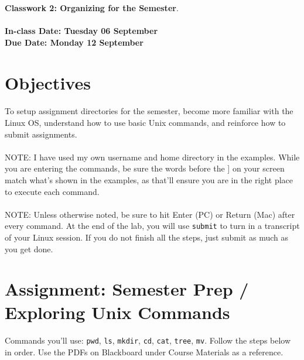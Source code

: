 \documentclass[letter,11pt]{article}
\begin{document}
\huge
\textbf{Classwork 2: Organizing for the Semester}.
\normalsize
\\ ~~ \\
\textbf{In-class Date: Tuesday 06 September} \\
\textbf{Due Date: Monday 12 September}

\section*{Objectives}
\paragraph{}To setup assignment directories for the semester, become more familiar with the Linux OS, understand how to use basic Unix commands, and reinforce how to submit assignments.
\paragraph{}NOTE: I have used my own username and home directory in the examples. While you are entering the commands, be sure the words before the ] on your screen match what’s shown in the examples, as that’ll ensure you are in the right place to execute each command.
\paragraph{}NOTE: Unless otherwise noted, be sure to hit Enter (PC) or Return (Mac) after every command. At the end of the lab, you will use \texttt{submit} to turn in a transcript of your Linux session. If you do not finish all the steps, just submit as much as you get done.

\section*{Assignment: Semester Prep / Exploring Unix Commands}
\paragraph{}Commands you'll use: \texttt{pwd}, \texttt{ls}, \texttt{mkdir}, \texttt{cd}, \texttt{cat}, \texttt{tree}, \texttt{mv}. Follow the steps below in order. Use the PDFs on Blackboard under Course Materials as a reference.
\end{document}
